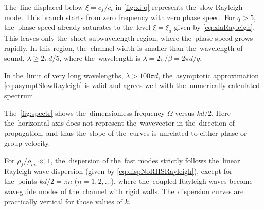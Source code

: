 The~line displaced below $\xi=c_f/c_t$ in \cref{fig:xi-q} represents the~slow Rayleigh mode.
This branch starts from zero frequency with zero phase speed.
For $q > 5$, the~phase speed already saturates to the~level $\xi=\xi_a$ given by \cref{eq:xiaRayleigh}.
This leaves only the~short subwavelength region, where the~phase speed grows rapidly.
In this region, the~channel width is smaller than the~wavelength of sound, $\lambda \geq 2 \pi d/5$, where the~wavelength is $\lambda=2\pi/\beta=2 \pi d/ q$.

In the~limit of very long wavelengths, $\lambda > 100 \pi d$, the~asymptotic approximation \cref{eq:asymptSlowRayleigh} is valid and agrees well with the~numerically calculated spectrum.

 

The~\cref{fig:spectr} shows the~dimensionless frequency $\Omega$ versus $kd/2$.
Here the~horizontal axis does not represent the~wavevector in the~direction of propagation, and thus the~slope of the~curves is unrelated to either phase or group velocity.

For $\rho_f/\rho_m \ll 1$, the~dispersion of the~fast modes strictly follows the~linear Rayleigh wave dispersion (given by \cref{eq:dispNoRHSRayleigh}), except for the~points $kd/2=\pi n$ ($n=1,2,\dots$), where the~coupled Rayleigh waves become waveguide modes of the~channel with rigid walls.
The~dispersion curves are practically vertical for those values of $k$.

